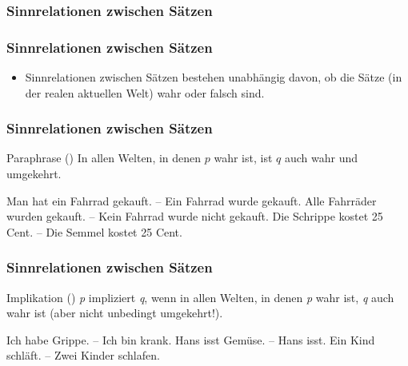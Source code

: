\subsubsection{Sinnrelationen zwischen Sätzen}

\begin{frame}
\frametitle{Sinnrelationen zwischen Sätzen}

\begin{itemize}
	\item Sinnrelationen zwischen Sätzen bestehen unabhängig davon, ob die Sätze (in der realen aktuellen Welt) wahr oder falsch sind.
\end{itemize}

\end{frame}


\begin{frame}
\frametitle{Sinnrelationen zwischen Sätzen}

\begin{block}{Paraphrase ()}
In allen Welten, in denen $p$ wahr ist, ist $q$ auch wahr und umgekehrt.
\end{block}


	\ea Man hat ein Fahrrad gekauft. -- Ein Fahrrad wurde gekauft.
	\ex Alle Fahrräder wurden gekauft. -- Kein Fahrrad wurde nicht gekauft.
	\ex Die Schrippe kostet 25 Cent. -- Die Semmel kostet 25 Cent.
	\z
		
\end{frame}


\begin{frame}
\frametitle{Sinnrelationen zwischen Sätzen}

\begin{block}{Implikation ()}
\textit{p} impliziert \textit{q}, wenn in allen Welten, in denen \textit{p} wahr ist, \textit{q} auch wahr ist (aber nicht unbedingt umgekehrt!).
\end{block}
		
\ea Ich habe Grippe. -- Ich bin krank.
\ex Hans isst Gemüse. -- Hans isst.
\ex Ein Kind schläft. -- Zwei Kinder schlafen.
\z

\end{frame}


